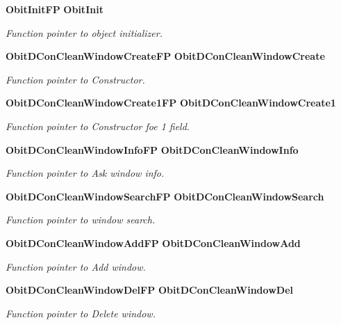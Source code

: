 \begin{CompactItemize}
{\bf Obit\-Init\-FP} {\bf Obit\-Init}
\begin{CompactList}\small\item\em Function pointer to object initializer. \item\end{CompactList}\item 
{\bf Obit\-DCon\-Clean\-Window\-Create\-FP} {\bf Obit\-DCon\-Clean\-Window\-Create}
\begin{CompactList}\small\item\em Function pointer to Constructor. \item\end{CompactList}\item 
{\bf Obit\-DCon\-Clean\-Window\-Create1FP} {\bf Obit\-DCon\-Clean\-Window\-Create1}
\begin{CompactList}\small\item\em Function pointer to Constructor foe 1 field. \item\end{CompactList}\item 
{\bf Obit\-DCon\-Clean\-Window\-Info\-FP} {\bf Obit\-DCon\-Clean\-Window\-Info}
\begin{CompactList}\small\item\em Function pointer to Ask window info. \item\end{CompactList}\item 
{\bf Obit\-DCon\-Clean\-Window\-Search\-FP} {\bf Obit\-DCon\-Clean\-Window\-Search}
\begin{CompactList}\small\item\em Function pointer to window search. \item\end{CompactList}\item 
{\bf Obit\-DCon\-Clean\-Window\-Add\-FP} {\bf Obit\-DCon\-Clean\-Window\-Add}
\begin{CompactList}\small\item\em Function pointer to Add window. \item\end{CompactList}\item 
{\bf Obit\-DCon\-Clean\-Window\-Del\-FP} {\bf Obit\-DCon\-Clean\-Window\-Del}
\begin{CompactList}\small\item\em Function pointer to Delete window. \item\end{CompactList}\item 

\end{CompactItemize}
